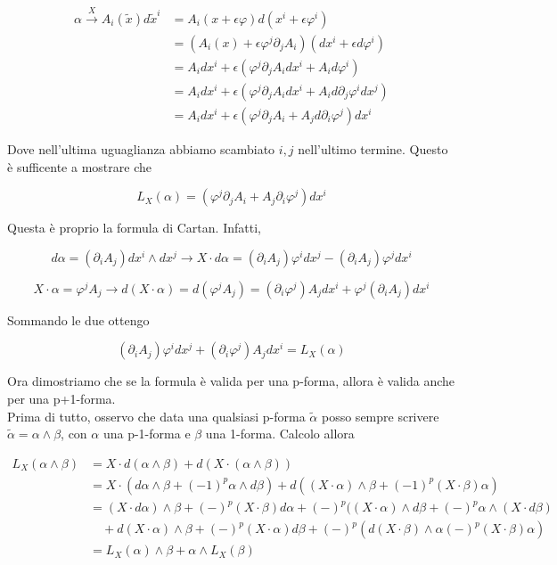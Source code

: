 \documentclass{report}
\begin{document}
\begin{align}
    \alpha \xrightarrow{X} A_i(\tilde{x})d\tilde{x}^i &= A_i(x + \epsilon\varphi)d(x^i + \epsilon\varphi^i) \\
    &= (A_i(x)+ \epsilon\varphi^j\partial_jA_i)(dx^i + \epsilon d\varphi^i) \\
    &= A_idx^i + \epsilon(\varphi^j\partial_jA_idx^i + A_id\varphi^i) \\
    &= A_idx^i + \epsilon(\varphi^j\partial_jA_idx^i + A_id\partial_j\varphi^idx^j) \\
    &= A_idx^i + \epsilon(\varphi^j\partial_jA_i + A_jd\partial_i\varphi^j)dx^i
\end{align}

Dove nell'ultima uguaglianza abbiamo scambiato $i, j$ nell'ultimo termine. Questo è sufficente a mostrare che 

\begin{equation}
    L_X(\alpha) = (\varphi^j\partial_jA_i + A_j\partial_i\varphi^j)dx^i
\end{equation}

Questa è proprio la formula di Cartan. Infatti, 

\begin{equation}
    d\alpha = (\partial_iA_j)dx^i \wedge dx^j \rightarrow X \cdot d\alpha = (\partial_iA_j)\varphi^idx^j - (\partial_iA_j)\varphi^jdx^i
\end{equation}

\begin{equation}
    X \cdot \alpha = \varphi^jA_j \rightarrow d(X \cdot \alpha)= d(\varphi^jA_j) = (\partial_i\varphi^j)A_jdx^i + \varphi^j(\partial_iA_j)dx^i
\end{equation}

Sommando le due ottengo

\begin{equation}
    (\partial_iA_j)\varphi^idx^j + (\partial_i\varphi^j)A_jdx^i = L_X(\alpha)
\end{equation}

Ora dimostriamo che se la formula è valida per una p-forma, allora è valida anche per una p+1-forma. \\
Prima di tutto, osservo che data una qualsiasi p-forma $\tilde{\alpha}$ posso sempre scrivere $\tilde{\alpha} = \alpha \wedge \beta$, con $\alpha$ una p-1-forma e $\beta$ una 1-forma. Calcolo allora 

\begin{align}
    L_X(\alpha \wedge \beta ) &= X \cdot d(\alpha \wedge\beta) + d(X \cdot (\alpha \wedge \beta)) \\
    &= X \cdot (d\alpha \wedge \beta + (-1)^p\alpha \wedge d\beta) + d((X\cdot \alpha) \wedge \beta +(-1)^p(X \cdot \beta) \alpha) \\
    &= (X \cdot d\alpha) \wedge \beta + (-)^p(X \cdot \beta) d\alpha +(-)^p((X \cdot \alpha) \wedge d\beta +(-)^p \alpha \wedge(X \cdot d\beta) \\
    & \quad + d(X \cdot \alpha) \wedge \beta + (-)^p (X\cdot \alpha) d\beta +(-)^p(d(X\cdot \beta ) \wedge \alpha (-)^p(X\cdot \beta)\alpha) \\
    &= L_X(\alpha) \wedge \beta + \alpha \wedge L_X(\beta)
\end{align}
\end{document}
